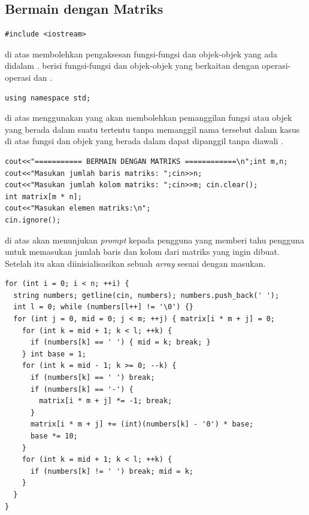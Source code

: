 \documentclass{subfiles}
\begin{document}
\subsection{Bermain dengan Matriks}

\begin{code}
\begin{verbatim}
#include <iostream>
\end{verbatim}
\end{code}

{\Script} di atas membolehkan pengaksesan fungsi-fungsi dan objek-objek yang ada didalam {\header} {\file} . {\Header} {\file}  berisi fungsi-fungsi dan objek-objek yang berkaitan dengan operasi-operasi {\ioi} dan {\ioo} {\stream}.

\begin{code}
\begin{verbatim}
using namespace std;
\end{verbatim}
\end{code}

{\Script} di atas menggunakan {\statement}  yang akan membolehkan pemanggilan fungsi atau objek yang berada dalam suatu  tertentu tanpa memanggil nama  tersebut dalam kasus di atas fungsi dan objek yang berada dalam  dapat dipanggil tanpa diawali .

\begin{code}
\begin{verbatim}
cout<<"=========== BERMAIN DENGAN MATRIKS ============\n";int m,n; 
cout<<"Masukan jumlah baris matriks: ";cin>>n;
cout<<"Masukan jumlah kolom matriks: ";cin>>m; cin.clear();
int matrix[m * n];
cout<<"Masukan elemen matriks:\n";
cin.ignore();
\end{verbatim}
\end{code}

{\Script} di atas akan menunjukan \textit{prompt} kepada pengguna yang memberi tahu pengguna untuk memasukan jumlah baris dan kolom dari matriks yang ingin dibuat. Setelah itu akan diinisialisasikan sebuah \textit{array} sesuai dengan masukan.

\begin{code}
\begin{verbatim}
for (int i = 0; i < n; ++i) {
  string numbers; getline(cin, numbers); numbers.push_back(' ');
  int l = 0; while (numbers[l++] != '\0') {}
  for (int j = 0, mid = 0; j < m; ++j) { matrix[i * m + j] = 0;
    for (int k = mid + 1; k < l; ++k) {
      if (numbers[k] == ' ') { mid = k; break; }
    } int base = 1;
    for (int k = mid - 1; k >= 0; --k) {
      if (numbers[k] == ' ') break;
      if (numbers[k] == '-') {
        matrix[i * m + j] *= -1; break;
      }
      matrix[i * m + j] += (int)(numbers[k] - '0') * base;
      base *= 10;
    }
    for (int k = mid + 1; k < l; ++k) { 
      if (numbers[k] != ' ') break; mid = k;
    }
  }
}
\end{verbatim}
\end{code}
\end{document}
